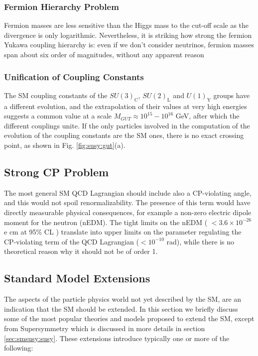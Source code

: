 \subsubsection*{Fermion Hierarchy Problem} 

Fermion masses are less sensitive than the Higgs mass to the cut-off scale as the divergence is only logarithmic. Nevertheless, it is striking how strong the fermion Yukawa coupling hierarchy is: even if we don't consider neutrinos, fermion masses span about six order of magnitudes, without any apparent reason

\subsubsection*{Unification of Coupling Constants}

The SM coupling constants of the $SU(3)_\mathrm{C}$, $SU(2)_\mathrm{L}$ and $U(1)_\mathrm{Y}$ groups have a different evolution, and the extrapolation of their values at very high energies suggests a common value at a scale $M_{GUT} \approx 10^{15}-10^{16}$ GeV, after which the different couplings unite. If the only particles involved in the computation of the evolution of the coupling constants are the SM ones, there is no exact crossing point, as shown in Fig. \ref{fig:susy:gut}(a).

\subsection*{Strong CP Problem}

The most general SM QCD Lagrangian should include also a CP-violating angle, and this would not spoil renormalizability. The presence of this term would have directly measurable physical consequences, for example a non-zero electric dipole moment for the neutron (nEDM). The tight  limits on the nEDM ( $< 3.6 \times 10^{-26}$ e cm at 95\% CL \cite{PhysRevD.92.092003}) translate into upper limits on the parameter regulating the CP-violating term of the QCD Lagrangian ($< 10^{-10}$ rad), while there is no theoretical reason why it should not be of order 1. 


\subsection{Standard Model Extensions}
\label{sec:sm:extensions}

The aspects of the particle physics world not yet described by the SM, are an indication that the SM should be extended.
In this section we briefly discuss some of the most popular theories and models proposed to extend the SM, except from Supersymmetry which is discussed in more details in section \ref{sec:smsusy:susy}. These extensions introduce typically one or more of the following:


